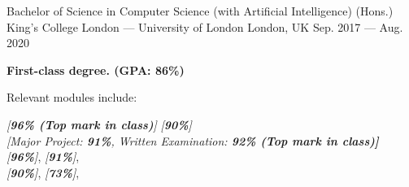 \begin{cventries}
    \cventry
    {Bachelor of Science in Computer Science (with Artificial Intelligence) (Hons.)} %
    {King’s College London --- University of London} %
    {London, UK} %
    {Sep. 2017 --- Aug. 2020} %
    {
        \begin{cvitems} %
            \item {\textbf{First-class degree. (GPA: 86\%)}}
            \item {Relevant modules include:
                        \begin{flushleft}
                            \bsep {}  \textit{[\textbf{96\% (Top mark in class)}]}
                            \bsep {} \textit{[\textbf{90\%}]}\\
                             \textit{[Major Project: \textbf{91\%}, Written Examination: \textbf{92\% (Top mark in class)]}}\\
                             \textit{[\textbf{96\%}]},
                             \textit{[\textbf{91\%}]}, \\
                             \textit{[\textbf{90\%}]},
                             \textit{[\textbf{73\%}]},\\
                        \end{flushleft}
                  }
        \end{cvitems}
    }


\end{cventries}
